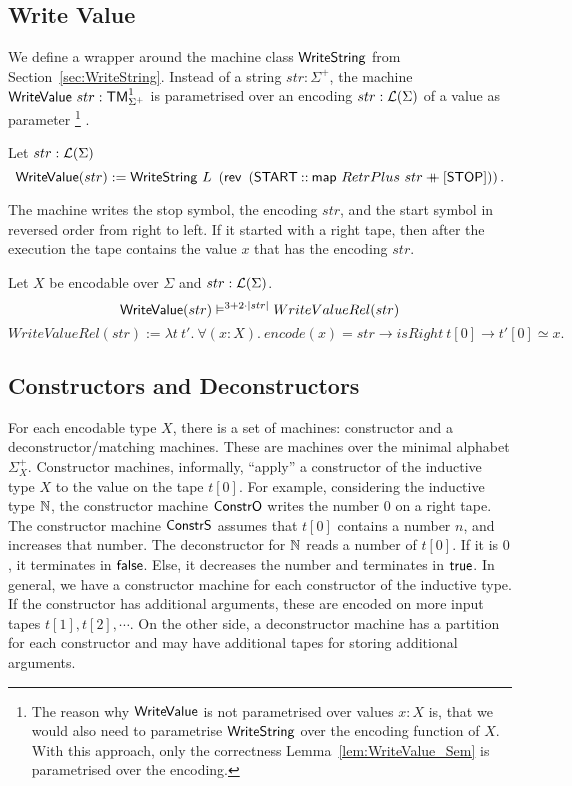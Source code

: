 \subsection{Write Value}
\label{sec:WriteValue}

We define a wrapper around the machine class $\mathsf{WriteString}$ from Section~\ref{sec:WriteString}.  Instead of a string $str : \Sigma^+$, the machine
$\mathsf{WriteValue}~str : \mathsf{TM}_{\Sigma^+}^1$ is parametrised over an encoding $str:\mathcal{L}(\Sigma)$ of a value as parameter%
\footnote{The reason why $\MS{WriteValue}$ is not parametrised over values $x:X$ is, that we would also need to parametrise $\mathsf{WriteString}$ over
  the encoding function of $X$.  With this approach, only the correctness Lemma~\ref{lem:WriteValue_Sem} is parametrised over the encoding.}%
.  %
\begin{definition}[$\MS{WriteValue}$][WriteValue]
  \label{def:WriteValue}
  Let $str:\mathcal{L}(\Sigma)$
  \[
    \mathsf{WriteValue}(str) := \mathsf{WriteString}~L~\left(\mathsf{rev}~\left(\mathsf{START} \mathbin{::} \mathsf{map}~RetrPlus~str \mathbin{+\mkern-10mu+} [\mathsf{STOP}]\right)\right).
  \]
\end{definition}
The machine writes the stop symbol, the encoding $str$, and the start symbol in reversed order from right to left.  If it started with a right tape,
then after the execution the tape contains the value $x$ that has the encoding $str$.
\begin{lemma}
  \label{lem:WriteValue_Sem}
  Let $X$ be encodable over $\Sigma$ and $str : \mathcal{L}(\Sigma)$.
  \[
    \mathsf{WriteValue}(str) \mathrel{\vDash^{3 + 2 \cdot \left| str \right|}} WriteValueRel(str)
  \]
  \[
    WriteValueRel(str) := \lambda t~t'.~\forall (x:X).~encode(x) = str \rightarrow isRight~t[0] \rightarrow t'[0] \simeq x.
  \]
\end{lemma}


\subsection{Constructors and Deconstructors}
\label{sec:constructors-deconstructors}


For each encodable type $X$, there is a set of machines: constructor and a deconstructor/matching machines.  These are machines over the minimal
alphabet $\Sigma_X^+$.  Constructor machines, informally, ``apply'' a constructor of the inductive type $X$ to the value on the tape $t[0]$.  For
example, considering the inductive type $\mathbb{N}$, the constructor machine $\mathsf{ConstrO}$ writes the number $0$ on a right tape.  The constructor machine
$\mathsf{ConstrS}$ assumes that $t[0]$ contains a number $n$, and increases that number.  The deconstructor for $\mathbb{N}$ reads a number of $t[0]$.  If it is
$0$, it terminates in $\mathsf{false}$.  Else, it decreases the number and terminates in $\mathsf{true}$.  In general, we have a constructor machine for each
constructor of the inductive type.  If the constructor has additional arguments, these are encoded on more input tapes $t[1], t[2], \cdots$.  On the
other side, a deconstructor machine has a partition for each constructor and may have additional tapes for storing additional arguments.

